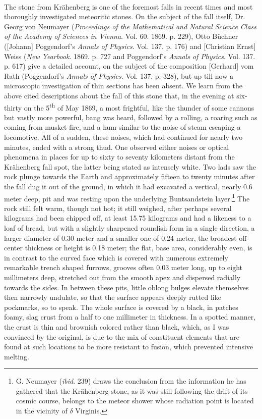 \documentclass[a4paper, 12pt, oneside]{article}
\begin{document}
\paragraph{}
The stone from Krähenberg is one of the foremost falls in recent times and most thoroughly investigated meteoritic stones. On the subject of the fall itself, Dr. Georg von Neumayer (\emph{Proceedings of the Mathematical and Natural Science Class of the Academy of Sciences in Vienna}. Vol. 60. 1869. p. 229), Otto Büchner ([Johann] Poggendorf's \emph{Annals of Physics}. Vol. 137. p. 176) and [Christian Ernst] Weiss (\emph{New Yearbook}. 1869. p. 727 and Poggendorf's \emph{Annals of Physics}. Vol. 137. p. 617) give a detailed account, on the subject of the composition [Gerhard] vom Rath (Poggendorf's \emph{Annals of Physics}. Vol. 137. p. 328), but up till now a microscopic investigation of thin sections has been absent. We learn from the above cited descriptions about the fall of this stone that, in the evening at six-thirty on the 5\textsuperscript{th} of May 1869, a most frightful, like the thunder of some cannons but vastly more powerful, bang was heard, followed by a rolling, a roaring such as coming from musket fire, and a hum similar to the noise of steam escaping a locomotive. All of a sudden, these noises, which had continued for nearly two minutes, ended with a strong thud. One observed either noises or optical phenomena in places for up to sixty to seventy kilometers distant from the Krähenberg fall spot, the latter being stated as intensely white. Two lads saw the rock plunge towards the Earth and approximately fifteen to twenty minutes after the fall dug it out of the ground, in which it had excavated a vertical, nearly 0.6 meter deep, pit and was resting upon the underlying Buntsandstein layer.\footnote{G. Neumayer (\emph{ibid}. 239) draws the conclusion from the information he has gathered that the Krähenberg stone, as it was still following the drift of its cosmic course, belongs to the meteor shower whose radiation point is located in the vicinity of $\delta$ Virginis.} The rock still felt warm, though not hot; it still weighed, after perhaps several kilograms had been chipped off, at least 15.75 kilograms and had a likeness to a loaf of bread, but with a slightly sharpened roundish form in a single direction, a larger diameter of 0.30 meter and a smaller one of 0.24 meter, the broadest off-center thickness or height is 0.18 meter; the flat, base area, considerably even, is in contrast to the curved face which is covered with numerous extremely remarkable trench shaped furrows, grooves often 0.03 meter long, up to eight millimeters deep, stretched out from the smooth apex and dispersed radially towards the sides.  In between these pits, little oblong bulges elevate themselves then narrowly undulate, so that the surface appears deeply rutted like pockmarks, so to speak. The whole surface is covered by a black, in patches foamy, slag crust from a half to one millimeter in thickness. In a spotted manner, the crust is thin and brownish colored rather than black, which, as I was convinced by the original, is due to the mix of constituent elements that are found at such locations to be more resistant to fusion, which prevented intensive melting. 
\end{document}
